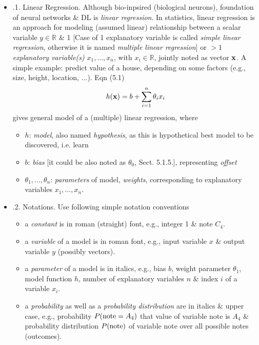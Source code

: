 \documentclass{article}
\begin{document}
\begin{itemize}
\begin{itemize}
		\begin{itemize}
			\item {.1. Linear Regression.} Although bio-inpsired (biological neurons), foundation of neural networks \& DL is {\it linear regression}. In statistics, linear regression is an approach for modeling (assumed linear) relationship between a scalar variable $y\in\mathbb{R}$ \& 1 [Case of 1 explanatory variable is called {\it simple linear regression}, otherwise it is named {\it multiple linear regression}] or $> 1$ {\it explanatory variable(s)} $x_1,\ldots,x_n$, with $x_i\in\mathbb{R}$, jointly noted as vector ${\bf x}$. A simple example: predict value of a house, depending on some factors (e.g., size, height, location, $\ldots$). Eqn (5.1)
			\begin{equation*}
				h({\bf x}) = b + \sum_{i=1}^n \theta_ix_i
			\end{equation*}
			gives general model of a (multiple) linear regression, where
			\begin{itemize}
				\item $h$: {\it model}, also named {\it hypothesis}, as this is hypothetical best model to be discovered, i.e. learn
				\item $b$: {\it bias} [it could be also noted as $\theta_0$, Sect. 5.1.5.], representing {\it offset}
				\item $\theta_1,\ldots,\theta_n$: {\it parameters} of model, {\it weights}, corresponding to explanatory variables $x_1,\ldots,x_n$.
			\end{itemize}
			\item {.2. Notations.} Use following simple notation conventions
			\begin{itemize}
				\item a {\it constant} is in roman (straight) font, e.g., integer 1 \& note $C_4$.
				\item a {\it variable} of a model is in roman font, e.g., input variable $x$ \& output variable $y$ (possibly vectors).
				\item a {\it parameter} of a model is in italics, e.g., bias $b$, weight parameter $\theta_1$, model function $h$, number of explanatory variables $n$ \& index $i$ of a variable $x_i$.
				\item a {\it probability} as well as a {\it probability distribution} are in italics \& upper case, e.g., probability $P({\rm note} = A_4)$ that value of variable note is $A_4$ \& probability distribution $P({\rm note})$ of variable note over all possible notes (outcomes).
			\end{itemize}

\end{itemize}
\end{itemize}
\end{itemize}
\end{document}
